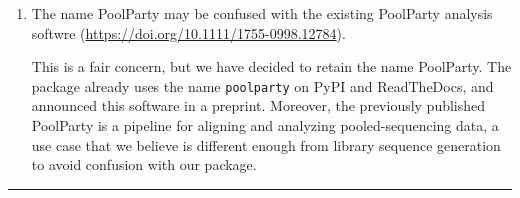 \documentclass[11pt]{article}
\newenvironment{response}{\par\color{responseblue}}{\par}
\newenvironment{msquote}
  {\begin{quote}\color{responseblue}\itshape\noindent\ignorespaces}
  {\end{quote}}
\newcommand{\reviewersection}[1]{%
  \bigskip\par\noindent{\large\bfseries #1}\par\medskip\hrule\medskip}
\begin{document}
\begin{enumerate}

\item The name PoolParty may be confused with the existing PoolParty analysis
softwre (\url{https://doi.org/10.1111/1755-0998.12784}).

\begin{response}
This is a fair concern, but we have decided to retain the name PoolParty. The package already uses the name \texttt{poolparty} on PyPI and ReadTheDocs, and announced this software in a preprint. Moreover, the previously published PoolParty is a pipeline for aligning and analyzing pooled-sequencing data, a use case that we believe is different enough from library sequence generation to avoid confusion with our package. 
\end{response}

\end{enumerate}

\reviewersection{Reviewer 3}
\end{document}
